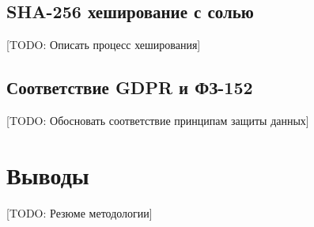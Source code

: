 \subsection{SHA-256 хеширование с солью}
\label{subsec:method:hashing}

[TODO: Описать процесс хеширования]

\subsection{Соответствие GDPR и ФЗ-152}
\label{subsec:method:compliance}

[TODO: Обосновать соответствие принципам защиты данных]

\section{Выводы}
\label{sec:method:conclusions}

[TODO: Резюме методологии]
